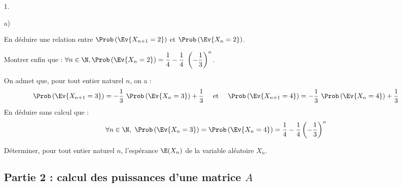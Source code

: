 \begin{noliste}{1.}
\begin{noliste}{a)}
    

  \item En déduire une relation entre $\Prob\left(\Ev{X_{n + 1} =
        2}\right)$ et $\Prob\left(\Ev{X_{n} = 2}\right)$.

    




  \item Montrer enfin que : $\forall n \in \N, \Prob\left(\Ev{X_{n} =
        2}\right) = \dfrac{1}{4} - \dfrac{1}{4} \
    \left(-\dfrac{1}{3}\right)^{n}$.

    

  \end{noliste}
  
\item On admet que, pour tout entier naturel $n$, on a :
  \[
  \Prob\left(\Ev{X_{n + 1} = 3}\right) = -\dfrac{1}{3} \ 
  \Prob\left(\Ev{X_{n} = 3}\right) + \dfrac{1}{3} \quad \hbox{ et }
  \quad \Prob\left(\Ev{X_{n + 1} = 4}\right) = -\dfrac{1}{3} \ 
  \Prob\left(\Ev{X_{n} = 4}\right) + \dfrac{1}{3}
  \]
  En déduire sans calcul que :
  \[
  \forall n \in \N, \ \Prob\left(\Ev{X_{n} = 3}\right) =
  \Prob\left(\Ev{X_{n} = 4}\right) =
  \dfrac{1}{4}-\dfrac{1}{4}\left(-\dfrac{1}{3}\right)^{n}
  \]

  



  
\item Déterminer, pour tout entier naturel $n$, l'espérance
  $\E(X_{n})$ de la variable aléatoire $X_{n}$.

  

\end{noliste}


\newpage


\subsection*{Partie 2 : calcul des puissances d'une matrice $A$}


